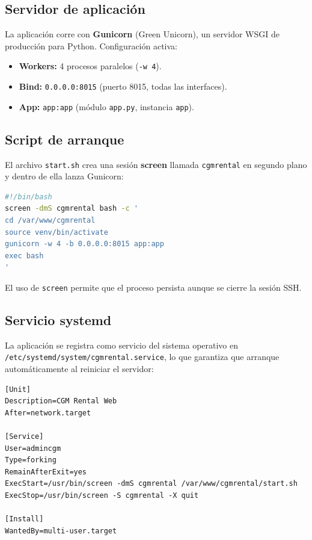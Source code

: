 \documentclass[11pt,a4paper]{article}
\begin{document}
\subsection{Servidor de aplicación}

La aplicación corre con \textbf{Gunicorn} (Green Unicorn), un servidor
WSGI de producción para Python. Configuración activa:

\begin{itemize}[leftmargin=*]
    \item \textbf{Workers:} 4 procesos paralelos (\texttt{-w 4}).
    \item \textbf{Bind:} \texttt{0.0.0.0:8015} (puerto 8015, todas las
        interfaces).
    \item \textbf{App:} \texttt{app:app} (módulo \texttt{app.py},
        instancia \texttt{app}).
\end{itemize}

\subsection{Script de arranque}

El archivo \texttt{start.sh} crea una sesión \textbf{screen} llamada
\texttt{cgmrental} en segundo plano y dentro de ella lanza Gunicorn:

\begin{lstlisting}[language=bash]
#!/bin/bash
screen -dmS cgmrental bash -c '
cd /var/www/cgmrental
source venv/bin/activate
gunicorn -w 4 -b 0.0.0.0:8015 app:app
exec bash
'
\end{lstlisting}

El uso de \texttt{screen} permite que el proceso persista aunque se
cierre la sesión SSH.

\subsection{Servicio systemd}

La aplicación se registra como servicio del sistema operativo en
\texttt{/etc/systemd/system/cgmrental.service}, lo que garantiza que
arranque automáticamente al reiniciar el servidor:

\begin{lstlisting}
[Unit]
Description=CGM Rental Web
After=network.target

[Service]
User=admincgm
Type=forking
RemainAfterExit=yes
ExecStart=/usr/bin/screen -dmS cgmrental /var/www/cgmrental/start.sh
ExecStop=/usr/bin/screen -S cgmrental -X quit

[Install]
WantedBy=multi-user.target
\end{lstlisting}
\end{document}
